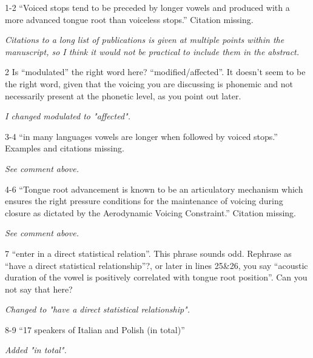 \documentclass[]{article}
\begin{document}
1-2 ``Voiced stops tend to be preceded by longer vowels and produced
with a more advanced tongue root than voiceless stops.'' Citation
missing.

\begin{adjustwidth}{1cm}{} \textit{
Citations to a long list of publications is given at multiple points within the manuscript, so I think it would not be practical to include them in the abstract.
} \end{adjustwidth}

2 Is ``modulated'' the right word here? ``modified/affected''. It
doesn't seem to be the right word, given that the voicing you are
discussing is phonemic and not necessarily present at the phonetic
level, as you point out later.

\begin{adjustwidth}{1cm}{} \textit{
I changed modulated to "affected".
} \end{adjustwidth}

3-4 ``in many languages vowels are longer when followed by voiced
stops.'' Examples and citations missing.

\begin{adjustwidth}{1cm}{} \textit{
See comment above.
} \end{adjustwidth}

4-6 ``Tongue root advancement is known to be an articulatory mechanism
which ensures the right pressure conditions for the maintenance of
voicing during closure as dictated by the Aerodynamic Voicing
Constraint.'' Citation missing.

\begin{adjustwidth}{1cm}{} \textit{
See comment above.
} \end{adjustwidth}

7 ``enter in a direct statistical relation''. This phrase sounds odd.
Rephrase as ``have a direct statistical relationship''?, or later in
lines 25\&26, you say ``acoustic duration of the vowel is positively
correlated with tongue root position''. Can you not say that here?

\begin{adjustwidth}{1cm}{} \textit{
Changed to "have a direct statistical relationship".
} \end{adjustwidth}

8-9 ``17 speakers of Italian and Polish (in total)''

\begin{adjustwidth}{1cm}{} \textit{
Added "in total".
} \end{adjustwidth}
\end{document}

